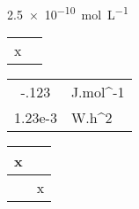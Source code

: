 \documentclass{article}
\begin{document}
\SI{2.5e-10}{mol.L^{-1}}

\begin{tabular}{Ss}
    \\  %
x & \\  %
\end{tabular}

\vrule
\begin{tabular}{Ss}
  -.123 & J.mol^{-1} \\
  1.23e-3 & W.h^{2} \\
\end{tabular}%
\vrule

\vrule
\begin{tabular}{Ss}
   \\\hline
   x & \\\hline
   & x \\
\end{tabular}%
\vrule
\end{document}
